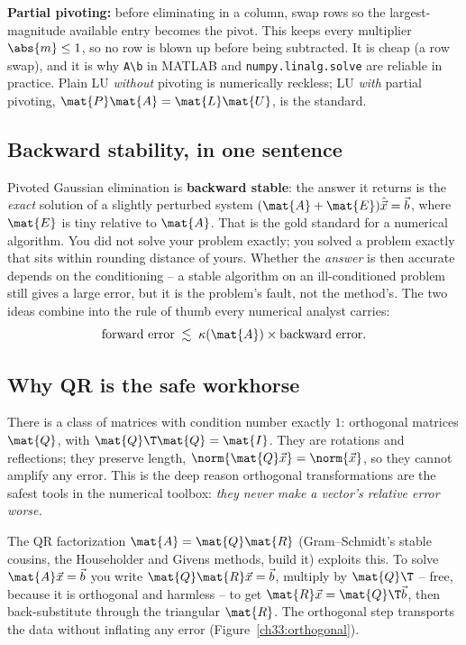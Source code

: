 \begin{focusbox}
\textbf{Partial pivoting:} before eliminating in a column, swap rows so the
largest-magnitude available entry becomes the pivot. This keeps every multiplier
$\abs{m}\le 1$, so no row is blown up before being subtracted. It is cheap (a row swap),
and it is why \texttt{A\textbackslash b} in MATLAB and \texttt{numpy.linalg.solve} are
reliable in practice. Plain LU \emph{without} pivoting is numerically reckless; LU
\emph{with} partial pivoting, $\mat{P}\mat{A}=\mat{L}\mat{U}$, is the standard.
\end{focusbox}

\subsection{Backward stability, in one sentence}

Pivoted Gaussian elimination is \textbf{backward stable}: the answer it returns is the
\emph{exact} solution of a slightly perturbed system $(\mat{A}+\mat{E})\hat{\vec{x}} =
\vec{b}$, where $\mat{E}$ is tiny relative to $\mat{A}$. That is the gold standard for a
numerical algorithm. You did not solve your problem exactly; you solved a problem
exactly that sits within rounding distance of yours. Whether the \emph{answer} is then
accurate depends on the conditioning -- a stable algorithm on an ill-conditioned
problem still gives a large error, but it is the problem's fault, not the method's. The
two ideas combine into the rule of thumb every numerical analyst carries:
\[
  \text{forward error} \;\lesssim\; \kappa(\mat{A}) \times \text{backward error}.
\]

\subsection{Why QR is the safe workhorse}

There is a class of matrices with condition number exactly $1$: orthogonal matrices
$\mat{Q}$, with $\mat{Q}\T\mat{Q}=\mat{I}$. They are rotations and reflections; they
preserve length, $\norm{\mat{Q}\vec{x}}=\norm{\vec{x}}$, so they cannot amplify any
error. This is the deep reason orthogonal transformations are the safest tools in the
numerical toolbox: \emph{they never make a vector's relative error worse.}

The QR factorization $\mat{A}=\mat{Q}\mat{R}$ (Gram--Schmidt's stable cousins, the
Householder and Givens methods, build it) exploits this. To solve
$\mat{A}\vec{x}=\vec{b}$ you write $\mat{Q}\mat{R}\vec{x}=\vec{b}$, multiply by
$\mat{Q}\T$ -- free, because it is orthogonal and harmless -- to get
$\mat{R}\vec{x}=\mat{Q}\T\vec{b}$, then back-substitute through the triangular $\mat{R}$.
The orthogonal step transports the data without inflating any error
(Figure~\ref{ch33:orthogonal}).

